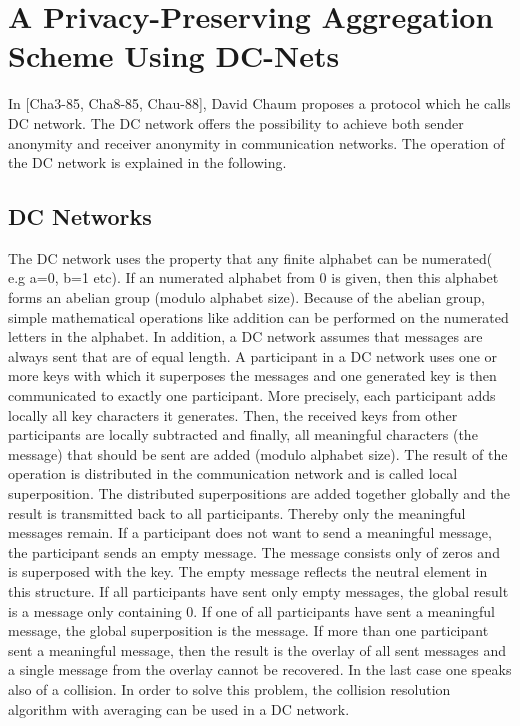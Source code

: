 \section{A Privacy-Preserving Aggregation Scheme Using DC-Nets}
In [Cha3-85, Cha8-85, Chau-88], David Chaum proposes a protocol which he calls DC network. The DC network offers the possibility to achieve both sender anonymity and receiver anonymity in communication networks. The operation of the DC network is explained in the following.
\subsection{DC Networks}
The DC network uses the property that any finite alphabet can be numerated( e.g a=0, b=1 etc). If an numerated alphabet from 0 is given, then this alphabet forms an abelian group (modulo alphabet size). Because of the abelian group, simple mathematical operations like addition can be performed on the numerated letters in the alphabet.
In addition, a DC network assumes that messages are always sent that are of equal length. A participant in a DC network uses one or more keys with which it superposes the messages and one generated key is then communicated to exactly one participant. 
More precisely, each participant adds locally all key characters it generates. Then, the received keys from other participants are locally subtracted and finally, all meaningful characters (the message) that should be sent are added (modulo alphabet size). The result of the operation is distributed in the communication network and is called local superposition. 
The distributed superpositions are added together globally and the result is transmitted back to all participants. Thereby only the meaningful messages remain. If a participant does not want to send a meaningful message, the participant sends an empty message. The message consists only of zeros and is superposed with the key. The empty message reflects the neutral element in this structure. If all participants have sent only empty messages, the global result is a message only containing 0. If one of all participants have sent a meaningful message, the global superposition is the message. If more than one participant sent a meaningful message, then the result is the overlay of all sent messages and a single message from the overlay cannot be recovered. In the last case one speaks also of a collision. In order to solve this problem, the collision resolution algorithm with averaging can be used in a DC network. 
